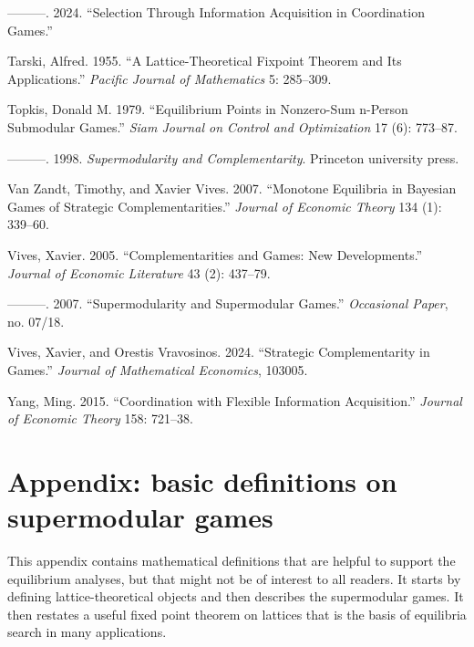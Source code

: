 \documentclass[
]{article}
\newlength{\cslhangindent}
\newenvironment{CSLReferences}[2] %
 {\begin{list}{}{%
  \setlength{\itemindent}{0pt}
  \setlength{\leftmargin}{0pt}
  \setlength{\parsep}{0pt}
  \ifodd #1
   \setlength{\leftmargin}{\cslhangindent}
   \setlength{\itemindent}{-1\cslhangindent}
  \fi
  \setlength{\itemsep}{#2\baselineskip}}}
 {\end{list}}
\theoremstyle{plain}
\theoremstyle{definition}
\theoremstyle{remark}
\begin{document}
\begin{CSLReferences}{1}{0}
---------. 2024. {``Selection Through Information Acquisition in
Coordination Games.''}

Tarski, Alfred. 1955. {``A Lattice-Theoretical Fixpoint Theorem and Its
Applications.''} \emph{Pacific Journal of Mathematics} 5: 285--309.

Topkis, Donald M. 1979. {``Equilibrium Points in Nonzero-Sum n-Person
Submodular Games.''} \emph{Siam Journal on Control and Optimization} 17
(6): 773--87.

---------. 1998. \emph{Supermodularity and Complementarity}. Princeton
university press.

Van Zandt, Timothy, and Xavier Vives. 2007. {``Monotone Equilibria in
Bayesian Games of Strategic Complementarities.''} \emph{Journal of
Economic Theory} 134 (1): 339--60.

Vives, Xavier. 2005. {``Complementarities and Games: New
Developments.''} \emph{Journal of Economic Literature} 43 (2): 437--79.

---------. 2007. {``Supermodularity and Supermodular Games.''}
\emph{Occasional Paper}, no. 07/18.

Vives, Xavier, and Orestis Vravosinos. 2024. {``Strategic
Complementarity in Games.''} \emph{Journal of Mathematical Economics},
103005.

Yang, Ming. 2015. {``Coordination with Flexible Information
Acquisition.''} \emph{Journal of Economic Theory} 158: 721--38.

\end{CSLReferences}

\newpage

\section*{Appendix: basic definitions on supermodular
games}\label{appendix-basic-definitions-on-supermodular-games}

This appendix contains mathematical definitions that are helpful to
support the equilibrium analyses, but that might not be of interest to
all readers. It starts by defining lattice-theoretical objects and then
describes the supermodular games. It then restates a useful fixed point
theorem on lattices that is the basis of equilibria search in many
applications.
\end{document}
